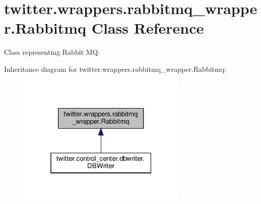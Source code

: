 \hypertarget{classtwitter_1_1wrappers_1_1rabbitmq__wrapper_1_1Rabbitmq}{}\section{twitter.\+wrappers.\+rabbitmq\+\_\+wrapper.\+Rabbitmq Class Reference}
\label{classtwitter_1_1wrappers_1_1rabbitmq__wrapper_1_1Rabbitmq}


Class representing Rabbit MQ.  




Inheritance diagram for twitter.\+wrappers.\+rabbitmq\+\_\+wrapper.\+Rabbitmq\+:\nopagebreak
\begin{figure}[H]
\begin{center}
\leavevmode
\includegraphics[width=229pt]{da/d15/classtwitter_1_1wrappers_1_1rabbitmq__wrapper_1_1Rabbitmq__inherit__graph}
\end{center}
\end{figure}
